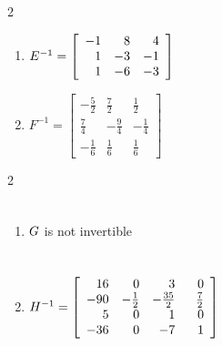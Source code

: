 \documentclass{ximera}
\begin{document}
\begin{multicols}{2} 
\begin{enumerate}
\setcounter{enumi}{\value{HW}}

\item $E^{-1} = \left[ \begin{array}{rrr} -1 & 8 & 4 \\ 1 & -3 & -1 \\ 1 & -6 & -3 \end{array} \right] \vphantom{\left[ \begin{array}{rrr} -\frac{5}{2} & \frac{7}{2} & \frac{1}{2} \\  \frac{7}{4} & -\frac{9}{4} & -\frac{1}{4} \\  -\frac{1}{6} & \frac{1}{6} & \frac{1}{6} \end{array} \right]}$
\item $F^{-1} = \left[ \begin{array}{rrr} -\frac{5}{2} & \frac{7}{2} & \frac{1}{2} \\  \frac{7}{4} & -\frac{9}{4} & -\frac{1}{4} \\  -\frac{1}{6} & \frac{1}{6} & \frac{1}{6} \end{array} \right]$

\setcounter{HW}{\value{enumi}}
\end{enumerate}
\end{multicols}

\begin{multicols}{2} 
\begin{enumerate}
\setcounter{enumi}{\value{HW}}

\item $G \vphantom{\left[ \begin{array}{rrrr} 16 & 0 & 3 & 0 \\  -90 & -\frac{1}{2} & -\frac{35}{2} & \frac{7}{2} \\  5 & 0 & 1 & 0 \\  -36 & 0 & -7 & \hphantom{-}1 \end{array} \right]}$ is not invertible
\item $H^{-1} = \left[ \begin{array}{rrrr} 16 & 0 & 3 & 0 \\  -90 & -\frac{1}{2} & -\frac{35}{2} & \frac{7}{2} \\  5 & 0 & 1 & 0 \\  -36 & 0 & -7 & \hphantom{-}1 \end{array} \right]$

\setcounter{HW}{\value{enumi}}
\end{enumerate}
\end{multicols}
\end{document}

